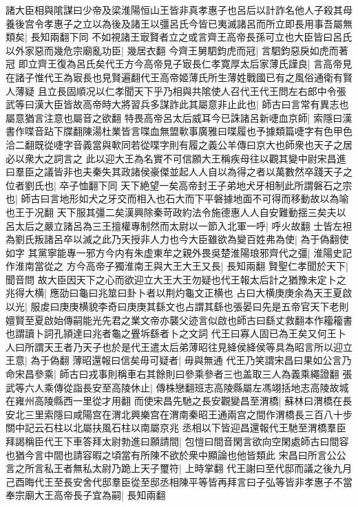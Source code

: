 諸大臣相與隂謀曰少帝及梁淮陽恒山王皆非真孝惠子也呂后以計詐名他人子殺其母養後宫令孝惠子之立以為後及諸王以彊呂氏今皆已夷滅諸呂而所立即長用事吾屬無類矣|{
	長知兩翻下同}
不如視諸王㝡賢者立之或言齊王高帝長孫可立也大臣皆曰呂氏以外家惡而幾危宗廟亂功臣|{
	幾居衣翻}
今齊王舅駟鈞虎而冠|{
	言駟鈞惡戾如虎而著冠}
即立齊王復為呂氏矣代王方今高帝見子㝡長仁孝寛厚太后家薄氏謹良|{
	言高帝見在諸子惟代王為㝡長也見賢遍翻代王高帝姬薄氏所生薄姓戰國已有之風俗通衛有賢人薄疑}
且立長固順况以仁孝聞天下乎乃相與共隂使人召代王代王問左右郎中令張武等曰漢大臣皆故高帝時大將習兵多謀詐此其屬意非止此也|{
	師古曰言常有異志也屬意猶言注意也屬音之欲翻}
特畏高帝呂太后威耳今已誅諸呂新啑血京師|{
	索隱曰漢書作喋音跕下牒翻陳湯杜業皆言喋血無盟㰱事廣雅曰喋履也予據類篇啑字有色甲色洽二翻既從啑字音義當與㰱同若從喋字則有履之義公羊傳曰京大也師衆也天子之居必以衆大之詞言之}
此以迎大王為名實不可信願大王稱疾母往以觀其變中尉宋昌進曰羣臣之議皆非也夫秦失其政諸侯豪傑並起人人自以為得之者以萬數然卒踐天子之位者劉氏也|{
	卒子恤翻下同}
天下絶望一矣高帝封王子弟地犬牙相制此所謂磐石之宗也|{
	師古曰言地形如犬之牙交而相入也石大而下平磐據地面不可得而移動故以為喻也王于况翻}
天下服其彊二矣漢興除秦苛政約法令施德惠人人自安難動揺三矣夫以呂太后之嚴立諸呂為三王擅權專制然而太尉以一節入北軍一呼|{
	呼火故翻}
士皆左袒為劉氏叛諸呂卒以滅之此乃天授非人力也今大臣雖欲為變百姓弗為使|{
	為于偽翻使如字}
其黨寧能專一邪方今内有朱虚東牟之親外畏吳楚淮陽琅邪齊代之彊|{
	淮陽史記作淮南當從之}
方今高帝子獨淮南王與大王大王又長|{
	長知兩翻}
賢聖仁孝聞於天下|{
	聞音問}
故大臣因天下之心而欲迎立大王大王勿疑也代王報太后計之猶豫未定卜之兆得大横|{
	應劭曰龜曰兆筮曰卦卜者以荆灼龜文正横也}
占曰大横庚庚余為天王夏啟以光|{
	服䖍曰庚庚横貌李奇曰庚庚其繇文也占謂其繇也張晏曰先是五帝官天下老則嬗賢至夏啟始傳嗣能光先君之業文帝亦襲父迹言似啟也師古曰繇丈救翻本作籕籕書也謂讀卜詞孔頴達曰兆者龜之舋坼繇者卜之文詞}
代王曰寡人固已為王矣又何王卜人曰所謂天王者乃天子也於是代王遣太后弟薄昭往見絳侯絳侯等具為昭言所以迎立王意|{
	為于偽翻}
薄昭還報曰信矣毋可疑者|{
	毋與無通}
代王乃笑謂宋昌曰果如公言乃命宋昌參乘|{
	師古曰戎事則稱車右其餘則曰參乘參者三也盖取三人為義乘繩證翻}
張武等六人乘傳從詣長安至高陵休止|{
	傳株戀翻班志高陵縣屬左馮翊括地志高陵故城在雍州高陵縣西一里從才用翻}
而使宋昌先馳之長安觀變昌至渭橋|{
	蘇林曰渭橋在長安北三里索隱曰咸陽宫在渭北興樂宫在渭南秦昭王通兩宫之間作渭橋長三百八十步關中記云石柱以北屬扶風石柱以南屬京兆}
丞相以下皆迎昌還報代王馳至渭橋羣臣拜謁稱臣代王下車答拜太尉勃進曰願請間|{
	包愷曰間音閑言欲向空閑處師古曰間容也猶今言中間也請容暇之頃當有所陳不欲於衆中顯論也他皆類此}
宋昌曰所言公公言之所言私王者無私太尉乃跪上天子璽符|{
	上時掌翻}
代王謝曰至代邸而議之後九月己酉晦代王至長安舍代邸羣臣從至邸丞相陳平等皆再拜言曰子弘等皆非孝惠子不當奉宗廟大王高帝長子宜為嗣|{
	長知兩翻}
